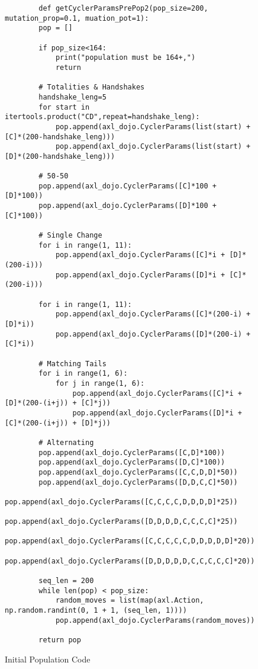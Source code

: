 \begin{figure}[ht] 
    \begin{verbatim}
        def getCyclerParamsPrePop2(pop_size=200, mutation_prop=0.1, muation_pot=1):
        pop = []
        
        if pop_size<164:
            print("population must be 164+,")
            return
        
        # Totalities & Handshakes
        handshake_leng=5
        for start in itertools.product("CD",repeat=handshake_leng):
            pop.append(axl_dojo.CyclerParams(list(start) + [C]*(200-handshake_leng)))
            pop.append(axl_dojo.CyclerParams(list(start) + [D]*(200-handshake_leng)))
    
        # 50-50
        pop.append(axl_dojo.CyclerParams([C]*100 + [D]*100))
        pop.append(axl_dojo.CyclerParams([D]*100 + [C]*100))
        
        # Single Change
        for i in range(1, 11):
            pop.append(axl_dojo.CyclerParams([C]*i + [D]*(200-i)))
            pop.append(axl_dojo.CyclerParams([D]*i + [C]*(200-i)))
    
        for i in range(1, 11):
            pop.append(axl_dojo.CyclerParams([C]*(200-i) + [D]*i))
            pop.append(axl_dojo.CyclerParams([D]*(200-i) + [C]*i))
        
        # Matching Tails
        for i in range(1, 6):
            for j in range(1, 6):
                pop.append(axl_dojo.CyclerParams([C]*i + [D]*(200-(i+j)) + [C]*j))
                pop.append(axl_dojo.CyclerParams([D]*i + [C]*(200-(i+j)) + [D]*j))
                
        # Alternating
        pop.append(axl_dojo.CyclerParams([C,D]*100))
        pop.append(axl_dojo.CyclerParams([D,C]*100)) 
        pop.append(axl_dojo.CyclerParams([C,C,D,D]*50))
        pop.append(axl_dojo.CyclerParams([D,D,C,C]*50))
        pop.append(axl_dojo.CyclerParams([C,C,C,C,D,D,D,D]*25))
        pop.append(axl_dojo.CyclerParams([D,D,D,D,C,C,C,C]*25))
        pop.append(axl_dojo.CyclerParams([C,C,C,C,C,D,D,D,D,D]*20))
        pop.append(axl_dojo.CyclerParams([D,D,D,D,D,C,C,C,C,C]*20))
        
        seq_len = 200
        while len(pop) < pop_size:
            random_moves = list(map(axl.Action, np.random.randint(0, 1 + 1, (seq_len, 1))))
            pop.append(axl_dojo.CyclerParams(random_moves))
        
        return pop        
    \end{verbatim}
    \caption{Initial Population Code}\label{code:initialPopulationCode}
\end{figure}

